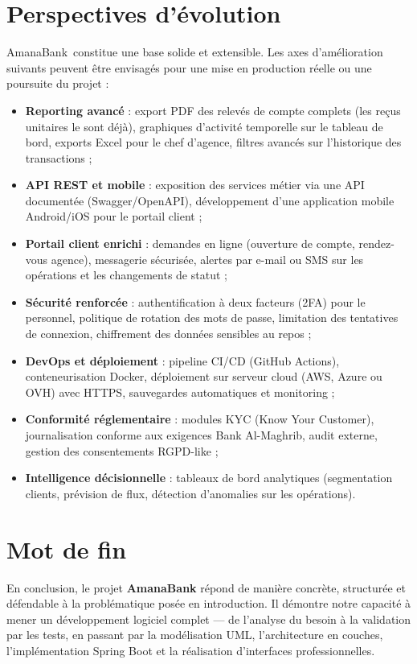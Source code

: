 \documentclass[11pt,a4paper,oneside]{report}
\newcommand{\nomapplication}{AmanaBank}
\begin{document}
\section*{Perspectives d'évolution}

\nomapplication\ constitue une base solide et extensible. Les axes d'amélioration suivants peuvent être envisagés pour une mise en production réelle ou une poursuite du projet :

\begin{itemize}
    \item \textbf{Reporting avancé} : export PDF des relevés de compte complets (les reçus unitaires le sont déjà), graphiques d'activité temporelle sur le tableau de bord, exports Excel pour le chef d'agence, filtres avancés sur l'historique des transactions ;
    \item \textbf{API REST et mobile} : exposition des services métier via une API documentée (Swagger/OpenAPI), développement d'une application mobile Android/iOS pour le portail client ;
    \item \textbf{Portail client enrichi} : demandes en ligne (ouverture de compte, rendez-vous agence), messagerie sécurisée, alertes par e-mail ou SMS sur les opérations et les changements de statut ;
    \item \textbf{Sécurité renforcée} : authentification à deux facteurs (2FA) pour le personnel, politique de rotation des mots de passe, limitation des tentatives de connexion, chiffrement des données sensibles au repos ;
    \item \textbf{DevOps et déploiement} : pipeline CI/CD (GitHub Actions), conteneurisation Docker, déploiement sur serveur cloud (AWS, Azure ou OVH) avec HTTPS, sauvegardes automatiques et monitoring ;
    \item \textbf{Conformité réglementaire} : modules KYC (Know Your Customer), journalisation conforme aux exigences Bank Al-Maghrib, audit externe, gestion des consentements RGPD-like ;
    \item \textbf{Intelligence décisionnelle} : tableaux de bord analytiques (segmentation clients, prévision de flux, détection d'anomalies sur les opérations).
\end{itemize}

\section*{Mot de fin}

En conclusion, le projet \textbf{\nomapplication} répond de manière concrète, structurée et défendable à la problématique posée en introduction. Il démontre notre capacité à mener un développement logiciel complet --- de l'analyse du besoin à la validation par les tests, en passant par la modélisation UML, l'architecture en couches, l'implémentation Spring Boot et la réalisation d'interfaces professionnelles.
\end{document}
